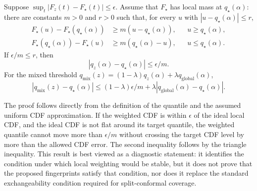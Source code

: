 \begin{proposition}
Suppose $\sup_t |F_z(t)-F_\star(t)|\le \epsilon$. Assume that $F_\star$ has local mass at $q_\star(\alpha)$: there are constants $m>0$ and $r>0$ such that, for every $u$ with $|u-q_\star(\alpha)|\le r$,
\begin{align}
    F_\star(u)-F_\star(q_\star(\alpha)) &\ge m(u-q_\star(\alpha)), && u\ge q_\star(\alpha),\\
    F_\star(q_\star(\alpha))-F_\star(u) &\ge m(q_\star(\alpha)-u), && u\le q_\star(\alpha).
\end{align}
If $\epsilon/m\le r$, then
\begin{equation}
    |q_z(\alpha)-q_\star(\alpha)|\le \epsilon/m.
\end{equation}
For the mixed threshold $q_{\mathrm{mix}}(z)=(1-\lambda)q_z(\alpha)+\lambda q_{\mathrm{global}}(\alpha)$,
\begin{equation}
    |q_{\mathrm{mix}}(z)-q_\star(\alpha)|
    \le (1-\lambda)\epsilon/m+\lambda |q_{\mathrm{global}}(\alpha)-q_\star(\alpha)|.
\end{equation}
\end{proposition}

\noindent The proof follows directly from the definition of the quantile and the assumed uniform CDF approximation. If the weighted CDF is within $\epsilon$ of the ideal local CDF, and the ideal CDF is not flat around its target quantile, the weighted quantile cannot move more than $\epsilon/m$ without crossing the target CDF level by more than the allowed CDF error. The second inequality follows by the triangle inequality. This result is best viewed as a diagnostic statement: it identifies the condition under which local weighting would be stable, but it does not prove that the proposed fingerprints satisfy that condition, nor does it replace the standard exchangeability condition required for split-conformal coverage.
